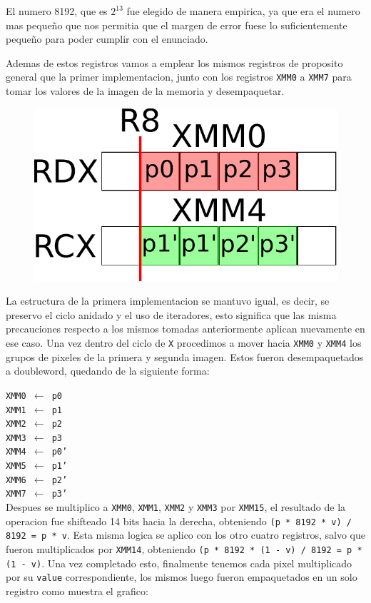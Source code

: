 El numero 8192, que es $2^{13}$ fue elegido de manera empirica, ya que era el numero mas pequeño que nos permitia que el margen de error fuese lo suficientemente pequeño para poder cumplir con el enunciado.

Ademas de estos registros vamos a emplear los mismos registros de proposito general que la primer implementacion, junto con los registros \texttt{XMM0} a \texttt{XMM7} para tomar los valores de la imagen de la memoria y desempaquetar.

\begin{figure}[h!]
	\centering
	\includegraphics[scale=0.5]{images/MergeASM2_0}
\end{figure}

La estructura de la primera implementacion se mantuvo igual, es decir, se preservo el ciclo anidado y el uso de iteradores, esto significa que las misma precauciones respecto a los mismos tomadas anteriormente aplican nuevamente en ese caso. Una vez dentro del ciclo de \texttt{X} procedimos a mover hacia \texttt{XMM0} y \texttt{XMM4} los grupos de pixeles de la primera y segunda imagen. Estos fueron desempaquetados a doubleword, quedando de la siguiente forma:

\noindent
\texttt{XMM0 $\gets$ p0}\\
\texttt{XMM1 $\gets$ p1}\\
\texttt{XMM2 $\gets$ p2}\\
\texttt{XMM3 $\gets$ p3}\\
\texttt{XMM4 $\gets$ p0'}\\
\texttt{XMM5 $\gets$ p1'}\\
\texttt{XMM6 $\gets$ p2'}\\
\texttt{XMM7 $\gets$ p3'}\\

Despues se multiplico a \texttt{XMM0}, \texttt{XMM1}, \texttt{XMM2} y \texttt{XMM3} por \texttt{XMM15}, el resultado de la operacion fue shifteado 14 bits hacia la derecha, obteniendo \texttt{(p * 8192 * v) / 8192 = p * v}. Esta misma logica se aplico con los otro cuatro registros, salvo que fueron multiplicados por \texttt{XMM14}, obteniendo \texttt{(p * 8192 * (1 - v) / 8192 = p * (1 - v)}. Una vez completado esto, finalmente tenemos cada pixel multiplicado por su \texttt{value} correspondiente, los mismos luego fueron empaquetados en un solo registro como muestra el grafico:

